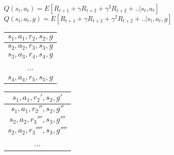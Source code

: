 \documentclass[12pt]{article}
\begin{document}
$Q(s_t, a_t) = E[R_{t+1} + \gamma R_{t+2} + \gamma^2 R_{t+2} + ..  | s_t, a_t]$\newline\newline
$Q(s_t, a_t, g) = E[R_{t+1} + \gamma R_{t+2} + \gamma^2 R_{t+2} + ..  | s_t, a_t, g]$ %

\begin{center}
 \begin{tabular}{|c|} 
 \hline
 $s_1, a_1, r_2, s_2, g$  \\ 
 \hline
 $s_2, a_2, r_3, s_3, g$  \\
 \hline
 $s_3, a_3, r_4, s_4, g$  \\
 \hline
 ... \\
 \hline
 $s_4, a_4, r_5, s_5, g$  \\
 \hline
\end{tabular}
\end{center}

\begin{center}
 \begin{tabular}{|c|} 
 \hline
 $s_1, a_1, r_2', s_2, g'$  \\ 
 \hline
 $s_1, a_1, r_2'', s_2, g''$  \\
 \hline
 $s_2, a_2, r_3''', s_3, g'''$  \\
 \hline
 $s_2, a_2, r_3'''', s_3, g''''$  \\
 \hline
 ... \\
 \hline
\end{tabular}
\end{center}
\end{document}
